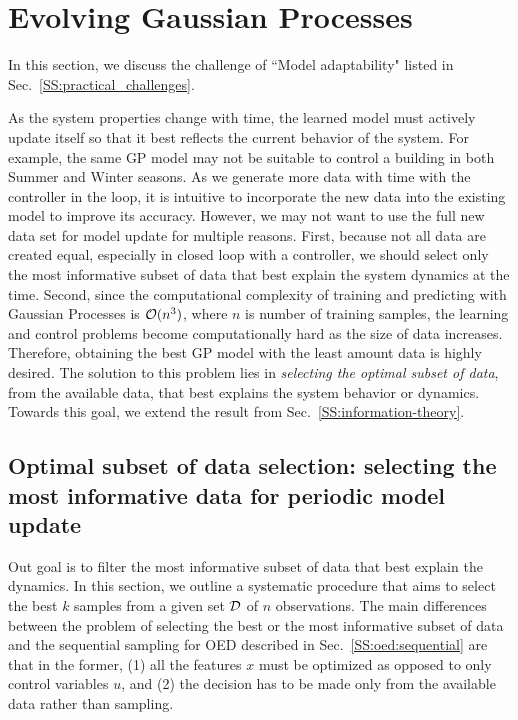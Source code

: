 \section{Evolving Gaussian Processes}
\label{S:active}

In this section, we discuss the challenge of ``Model adaptability" listed in Sec.~\ref{SS:practical_challenges}.

As the system properties change with time, the learned model must actively update itself so that it best reflects the current behavior of the system. %
For example, the same GP model may not be suitable to control a building in both Summer and Winter seasons.
As we generate more data with time with the controller in the loop, it is intuitive to incorporate the new data into the existing model to improve its accuracy.
However, we may not want to use the full new data set for model update for multiple reasons.
First, because not all data are created equal, especially in closed loop with a controller, we should select only the most informative subset of data that best explain the system dynamics at the time.
Second, since the computational complexity of training and predicting with Gaussian Processes is $\mathcal{O}(n^3)$, where $n$ is number of training samples, the learning and control problems become computationally hard as the size of data increases.
Therefore, obtaining the best GP model with the least amount data is highly desired.
The solution to this problem lies in \textit{selecting the optimal subset of data}, from the available data, that best explains the system behavior or dynamics.
Towards this goal, we extend the result from Sec.~\ref{SS:information-theory}.

\subsection{Optimal subset of data selection: selecting the most informative data for periodic model update}

Out goal is to filter the most informative subset of data that best explain the dynamics.
In this section, we outline a systematic procedure that aims to select the best $k$ samples from a given set $\mathcal{D}$ of $n$ observations.
The main differences between the problem of selecting the best or the most informative subset of data and the sequential sampling for OED described in Sec.~\ref{SS:oed:sequential} are that in the former, (1) all the features \(x\) must be optimized as opposed to only control variables \(u\), and (2) the decision has to be made only from the available data rather than sampling. 

